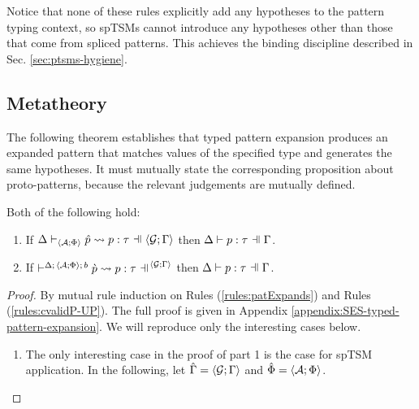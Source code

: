 {{{{Notice that none of these rules explicitly add any hypotheses to the pattern typing context, so spTSMs cannot introduce any hypotheses other than those that come from spliced patterns. This achieves the binding discipline described in Sec. \ref{sec:ptsms-hygiene}.

\subsection{Metatheory}
The following theorem establishes that typed pattern expansion produces an expanded pattern that matches values of the specified type and generates the same hypotheses. It must mutually state the corresponding proposition about proto-patterns, because the relevant judgements are mutually defined.
\begingroup
\def\thetheorem{\ref{thm:typed-pattern-expansion}}
\begin{theorem} Both of the following hold:
\begin{enumerate}
  \item If $\patExpands{\uGG{\uG}{\pctx}}{\uAP{\uA}{\Phi}}{\upv}{p}{\tau}$ then $\patType{\pctx}{p}{\tau}$.
  \item If $\cvalidP{\uGG{\uG}{\pctx}}{\pscene{\Delta}{\uAP{\uA}{\Phi}}{b}}{\cpv}{p}{\tau}$ then $\patType{\pctx}{p}{\tau}$.
\end{enumerate}
\end{theorem}
\begin{proof}
  By mutual rule induction on Rules (\ref{rules:patExpands}) and Rules (\ref{rules:cvalidP-UP}). The full proof is given in Appendix \ref{appendix:SES-typed-pattern-expansion}. We will reproduce only the interesting cases below.
  \begin{enumerate}
  \item The only interesting case in the proof of part 1 is the case for spTSM application. In the following, let $\hat\Gamma=\langle \mathcal{G}; \Gamma \rangle$ and $\hat\Phi=\langle \mathcal{A}; \Phi \rangle$.
  \begin{byCases}

\end{byCases}
\end{enumerate}
\end{proof}}}}}
